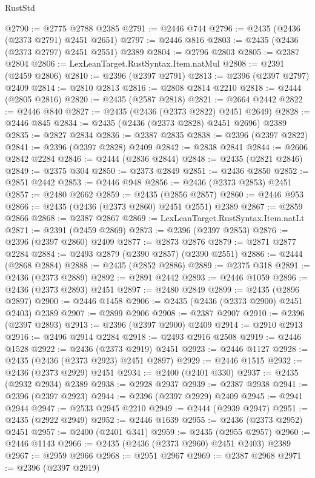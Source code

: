 \begin{lexlean}{RustStd}
\begin{coremodule}
@2790 := @2775 @2788 @2385
@2791 := @2446 @744
@2796 := @2435 (@2436 (@2373 @2791) @2451 @2651)
@2797 := @2446 @816
@2803 := @2435 (@2436 (@2373 @2797) @2451 @2551) @2389
@2804 := @2796 @2803
@2805 := @2387 @2804
@2806 := LexLeanTarget.RustSyntax.Item.natMul
@2808 := @2391 (@2459 @2806)
@2810 := @2396 (@2397 @2791)
@2813 := @2396 (@2397 @2797) @2409
@2814 := @2810 @2813
@2816 := @2808 @2814 @2210
@2818 := @2444 (@2805 @2816)
@2820 := @2435 (@2587 @2818)
@2821 := @2664 @2442
@2822 := @2446 @840
@2827 := @2435 (@2436 (@2373 @2822) @2451 @2649)
@2828 := @2446 @845
@2834 := @2435 (@2436 (@2373 @2828) @2451 @2696) @2389
@2835 := @2827 @2834
@2836 := @2387 @2835
@2838 := @2396 (@2397 @2822)
@2841 := @2396 (@2397 @2828) @2409
@2842 := @2838 @2841
@2844 := @2606 @2842 @2284
@2846 := @2444 (@2836 @2844)
@2848 := @2435 (@2821 @2846)
@2849 := @2375 @304
@2850 := @2373 @2849
@2851 := @2436 @2850
@2852 := @2851 @2442
@2853 := @2446 @948
@2856 := @2436 (@2373 @2853) @2451
@2857 := @2480 @2662
@2859 := @2435 (@2856 @2857)
@2860 := @2446 @953
@2866 := @2435 (@2436 (@2373 @2860) @2451 @2551) @2389
@2867 := @2859 @2866
@2868 := @2387 @2867
@2869 := LexLeanTarget.RustSyntax.Item.natLt
@2871 := @2391 (@2459 @2869)
@2873 := @2396 (@2397 @2853)
@2876 := @2396 (@2397 @2860) @2409
@2877 := @2873 @2876
@2879 := @2871 @2877 @2284
@2884 := @2493 @2879 (@2390 @2857) (@2390 @2551)
@2886 := @2444 (@2868 @2884)
@2888 := @2435 (@2852 @2886)
@2889 := @2375 @318
@2891 := @2436 (@2373 @2889)
@2892 := @2891 @2442
@2893 := @2446 @1059
@2896 := @2436 (@2373 @2893) @2451
@2897 := @2480 @2849
@2899 := @2435 (@2896 @2897)
@2900 := @2446 @1458
@2906 := @2435 (@2436 (@2373 @2900) @2451 @2403) @2389
@2907 := @2899 @2906
@2908 := @2387 @2907
@2910 := @2396 (@2397 @2893)
@2913 := @2396 (@2397 @2900) @2409
@2914 := @2910 @2913
@2916 := @2496 @2914 @2284
@2918 := @2493 @2916 @2508
@2919 := @2446 @1528
@2922 := @2436 (@2373 @2919) @2451
@2923 := @2446 @1127
@2928 := @2435 (@2436 (@2373 @2923) @2451 @2897)
@2929 := @2446 @1515
@2932 := @2436 (@2373 @2929) @2451
@2934 := @2400 (@2401 @330)
@2937 := @2435 (@2932 @2934) @2389
@2938 := @2928 @2937
@2939 := @2387 @2938
@2941 := @2396 (@2397 @2923)
@2944 := @2396 (@2397 @2929) @2409
@2945 := @2941 @2944
@2947 := @2533 @2945 @2210
@2949 := @2444 (@2939 @2947)
@2951 := @2435 (@2922 @2949)
@2952 := @2446 @1639
@2955 := @2436 (@2373 @2952) @2451
@2957 := @2400 (@2401 @341)
@2959 := @2435 (@2955 @2957)
@2960 := @2446 @1143
@2966 := @2435 (@2436 (@2373 @2960) @2451 @2403) @2389
@2967 := @2959 @2966
@2968 := @2951 @2967
@2969 := @2387 @2968
@2971 := @2396 (@2397 @2919)

\end{coremodule}
\end{lexlean}
